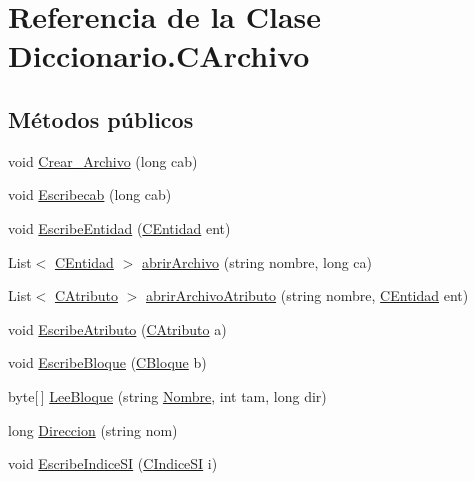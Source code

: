 \hypertarget{class_diccionario_1_1_c_archivo}{\section{Referencia de la Clase Diccionario.\-C\-Archivo}
\label{class_diccionario_1_1_c_archivo}
}
\subsection*{Métodos públicos}
\begin{DoxyCompactItemize}
\item 
void \hyperlink{class_diccionario_1_1_c_archivo_aa2a454a20d3efba9d4e0f743d502dbfd}{Crear\-\_\-\-Archivo} (long cab)
\item 
void \hyperlink{class_diccionario_1_1_c_archivo_afb4bd91b2d9d2caf113f5db15690a0ee}{Escribecab} (long cab)
\item 
void \hyperlink{class_diccionario_1_1_c_archivo_ae0adcec477f418b897b4215b37c852bc}{Escribe\-Entidad} (\hyperlink{class_diccionario_1_1_c_entidad}{C\-Entidad} ent)
\item 
List$<$ \hyperlink{class_diccionario_1_1_c_entidad}{C\-Entidad} $>$ \hyperlink{class_diccionario_1_1_c_archivo_a37133dbd0cae460592b708fe171eb3c1}{abrir\-Archivo} (string nombre, long ca)
\item 
List$<$ \hyperlink{class_diccionario_1_1_c_atributo}{C\-Atributo} $>$ \hyperlink{class_diccionario_1_1_c_archivo_a465fa860bddeeea4b33f3be2c0458986}{abrir\-Archivo\-Atributo} (string nombre, \hyperlink{class_diccionario_1_1_c_entidad}{C\-Entidad} ent)
\item 
void \hyperlink{class_diccionario_1_1_c_archivo_aa9ebfa9fd73864ceb0128cd5bc1bd47d}{Escribe\-Atributo} (\hyperlink{class_diccionario_1_1_c_atributo}{C\-Atributo} a)
\item 
void \hyperlink{class_diccionario_1_1_c_archivo_acbd23f567ed6728ff1b6746ddf047ec1}{Escribe\-Bloque} (\hyperlink{class_diccionario_1_1_c_bloque}{C\-Bloque} b)
\item 
byte\mbox{[}$\,$\mbox{]} \hyperlink{class_diccionario_1_1_c_archivo_a041611a8aee04b613a066906c4d641f0}{Lee\-Bloque} (string \hyperlink{class_diccionario_1_1_c_archivo_ae35f848874ff23f326c7fdbd5cc62f30}{Nombre}, int tam, long dir)
\item 
long \hyperlink{class_diccionario_1_1_c_archivo_a83c07d2c18588e2c62df36f553c71cd0}{Direccion} (string nom)
\item 
void \hyperlink{class_diccionario_1_1_c_archivo_adbfe2a5fc7bbacf1e851d8b65a3210d5}{Escribe\-Indice\-S\-I} (\hyperlink{class_diccionario_1_1_c_indice_s_i}{C\-Indice\-S\-I} i)

\end{DoxyCompactItemize}
